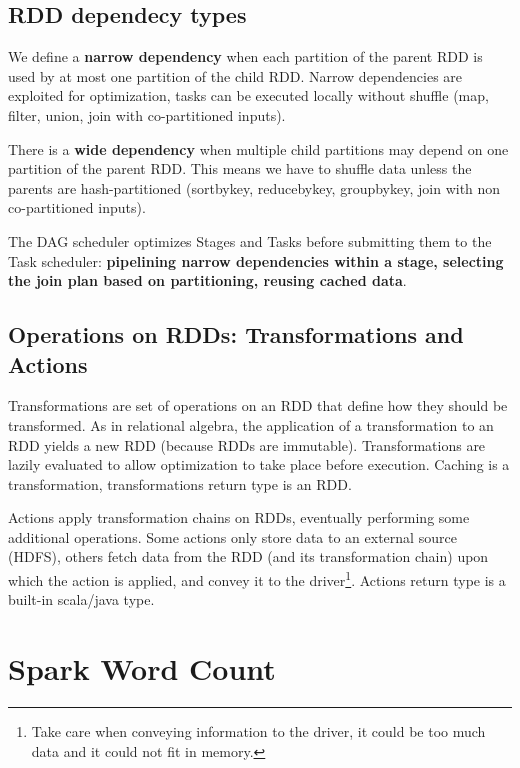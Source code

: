 	\subsection{RDD dependecy types}
		\par
		We define a \textbf{narrow dependency} when each partition of the parent RDD is used by at most one partition of the child RDD. Narrow dependencies are exploited for optimization, tasks can be executed locally without shuffle (map, filter, union, join with co-partitioned inputs).
		\newline
		\par\noindent
		There is a \textbf{wide dependency} when multiple child partitions may depend on one partition of the parent RDD. This means we have to shuffle data unless the parents are hash-partitioned (sortbykey, reducebykey, groupbykey, join with non co-partitioned inputs).
		\newline
		\par\noindent
		The DAG scheduler optimizes Stages and Tasks before submitting them to the Task scheduler: \textbf{pipelining narrow dependencies within a stage, selecting the join plan based on partitioning, reusing cached data}.
	\subsection{Operations on RDDs: Transformations and Actions}
		\par
		Transformations are set of operations on an RDD that define how they should be transformed. As in relational algebra, the application of a transformation to an RDD yields a new RDD (because RDDs are immutable). Transformations are lazily evaluated to allow optimization to take place before execution. Caching is a transformation, transformations return type is an RDD.
		\newline
		\par\noindent
		Actions apply transformation chains on RDDs, eventually performing some additional operations. Some actions only store data to an external source (HDFS), others fetch data from the RDD (and its transformation chain) upon which the action is applied, and convey it to the driver\footnote{Take care when conveying information to the driver, it could be too much data and it could not fit in memory.}. Actions return type is a built-in scala/java type.
\section{Spark Word Count}
